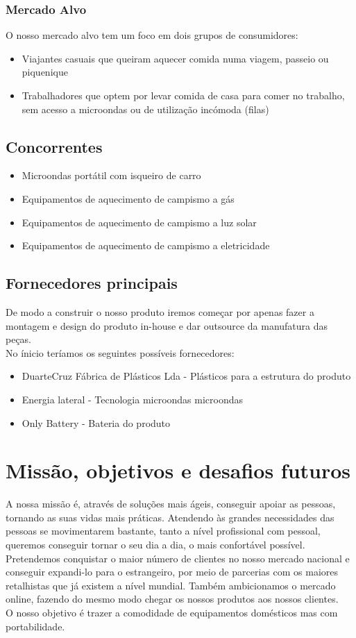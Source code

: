 \documentclass[a4paper]{article}
\begin{document}
\subsubsection{Mercado Alvo}
O nosso mercado alvo tem um foco em dois grupos de consumidores:
\begin{itemize}
    \item Viajantes casuais que queiram aquecer comida numa viagem, passeio ou piquenique
    \item Trabalhadores que optem por levar comida de casa para comer no trabalho, sem acesso a microondas ou de utilização incómoda (filas)
\end{itemize}

\subsection{Concorrentes}
\begin{itemize}
    \item Microondas portátil com isqueiro de carro
    \item Equipamentos de aquecimento de campismo a gás
    \item Equipamentos de aquecimento de campismo a luz solar
    \item Equipamentos de aquecimento de campismo a eletricidade
\end{itemize}

\subsection{Fornecedores principais}
De modo a construir o nosso produto iremos começar por apenas fazer a montagem e design do produto in-house e dar outsource da manufatura das peças.\\
No ínicio teríamos os seguintes possíveis fornecedores:
\begin{itemize}
    \item DuarteCruz Fábrica de Plásticos Lda - Plásticos para a estrutura do produto
    \item Energia lateral - Tecnologia microondas microondas
    \item Only Battery - Bateria do produto
\end{itemize}

\section{Missão, objetivos e desafios futuros}
A nossa missão é, através de soluções mais ágeis, conseguir apoiar as pessoas, tornando as suas vidas mais práticas. Atendendo às grandes necessidades das pessoas se movimentarem bastante, tanto a nível profissional com pessoal, queremos conseguir tornar o seu dia a dia, o mais confortável possível.\\
Pretendemos conquistar o maior número de clientes no nosso mercado nacional e conseguir expandi-lo para o estrangeiro, por meio de parcerias com os maiores retalhistas que já existem a nível mundial. Também ambicionamos o mercado online, fazendo do mesmo modo chegar os nossos produtos aos nossos clientes.\\
O nosso objetivo é trazer a comodidade de equipamentos domésticos mas com portabilidade.
\end{document}
